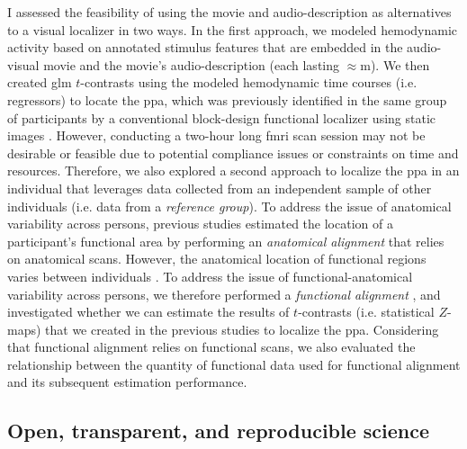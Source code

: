 I assessed the feasibility of using the movie and audio-description as
alternatives to a visual localizer in two ways.
In the first approach, we modeled hemodynamic activity based on annotated
stimulus features that are embedded in the audio-visual movie and the movie's
audio-description (each lasting $\approx$\unit[120]{m}).
We then created \ac{glm} $t$-contrasts using the modeled hemodynamic time
courses (i.e. regressors) to locate the \ac{ppa}, which was previously
identified in the same group of participants by a conventional block-design
functional localizer using static images \citep{sengupta2016extension}.
%
However, conducting a two-hour long \ac{fmri} scan session may not be desirable
or feasible due to potential compliance issues or constraints on time and
resources.
%
Therefore, we also explored a second approach to localize the \ac{ppa} in an
individual that leverages data collected from an independent sample of other
individuals (i.e. data from a \textit{reference group}).
To address the issue of anatomical variability across persons, previous studies
estimated the location of a participant's functional area by performing an
\textit{anatomical alignment} \citep{frost2012measuring,
rosenke2021probabilistic, weiner2018defining, zhen2017quantifying} that relies
on anatomical scans.
%
However, the anatomical location of functional regions varies between
individuals \citep{coalson2018impact, benson2014correction, natu2021sulcal,
wang2015probabilistic, frost2012measuring, langers2014assessment, weiner2014mid,
rosenke2021probabilistic}.
To address the issue of functional-anatomical variability across persons, we
therefore performed a \textit{functional alignment} \citep[cf.][for
reviews]{haxby2020hyperalignment, bazeille2021empirical}, and investigated
whether we can estimate the results of $t$-contrasts (i.e. statistical $Z$-maps)
that we created in the previous studies to localize the \ac{ppa}.
%
Considering that functional alignment relies on functional scans, we also
evaluated the relationship between the quantity of functional data used for
functional alignment and its subsequent estimation performance.



\subsection{Open, transparent, and reproducible science}

